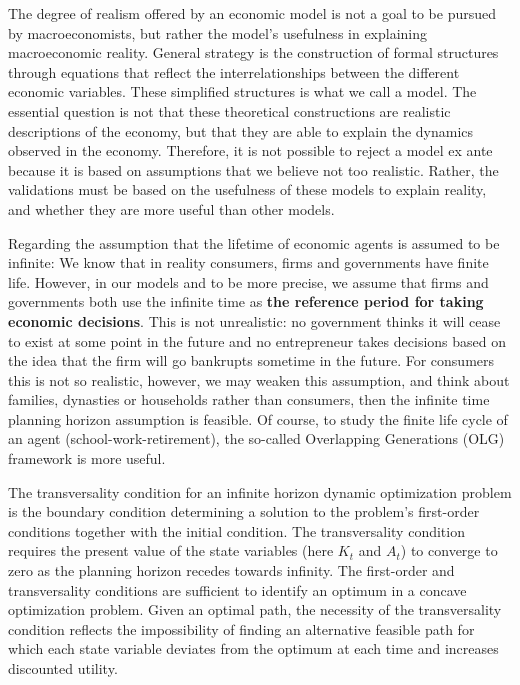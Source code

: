 \begin{Solution}{3}
	The degree of realism offered by an economic model is not a goal to be pursued by macroeconomists, but rather the model's usefulness in explaining macroeconomic reality. General strategy is the construction of formal structures through equations that reflect the interrelationships between the different economic variables. These simplified structures is what we call a model. The essential question is not that these theoretical constructions are realistic descriptions of the economy, but that they are able to explain the dynamics observed in the economy. Therefore, it is not possible to reject a model ex ante because it is based on assumptions that we believe not too realistic. Rather, the validations must be based on the usefulness of these models to explain reality, and whether they are more useful than other models.

	Regarding the assumption that the lifetime of economic agents is assumed to be infinite: We know that in reality consumers, firms and governments have finite life. However, in our models and to be more precise, we assume that firms and governments both use the infinite time as \textbf{the reference period for taking economic decisions}. This is not unrealistic: no government thinks it will cease to exist at some point in the future and no entrepreneur takes decisions based on the idea that the firm will go bankrupts sometime in the future. For consumers this is not so realistic, however, we may weaken this assumption, and think about families, dynasties or households rather than consumers, then the infinite time planning horizon assumption is feasible. Of course, to study the finite life cycle of an agent (school-work-retirement), the so-called Overlapping Generations (OLG) framework is more useful.
	
\end{Solution}
\begin{Solution}{1}
			The transversality condition for an infinite horizon dynamic optimization problem is the boundary condition determining a solution to the problem's first-order conditions together with the initial condition. The transversality condition requires the present value of the state variables (here $K_t$ and $A_t$) to converge to zero as the planning horizon recedes towards infinity. The first-order and transversality conditions are sufficient to identify an optimum in a concave optimization problem. Given an optimal path, the necessity of the transversality condition reflects the impossibility of finding an alternative feasible path for which each state variable deviates from the optimum at each time and increases discounted utility.
		
\end{Solution}
